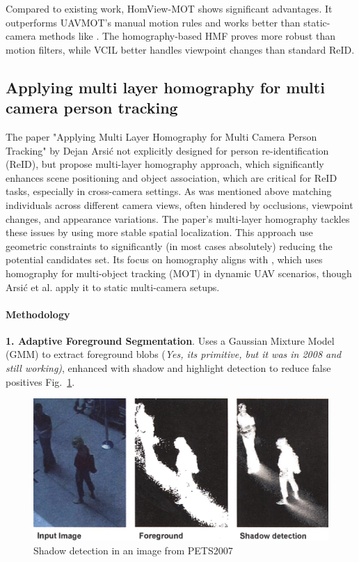 \documentclass[12pt, a4paper]{article}
\begin{document}
Compared to existing work, HomView-MOT shows significant advantages. It outperforms UAVMOT's manual motion rules and works better than static-camera methods like \cite{DeepSORT, SORT, StrongSORT}. The homography-based HMF proves more robust than motion filters, while VCIL better handles viewpoint changes than standard ReID. 


\subsection{Applying multi layer homography for multi camera person tracking  \cite{multi-layer-homography}}
The paper "Applying Multi Layer Homography for Multi Camera Person Tracking" by Dejan Arsić \cite{multi-layer-homography} not explicitly designed for person re-identification (ReID), but propose multi-layer homography approach, which significantly enhances scene positioning and object association, which are critical for ReID tasks, especially in cross-camera settings. As was mentioned above matching individuals across different camera views, often hindered by occlusions, viewpoint changes, and appearance variations. The paper’s multi-layer homography tackles these issues by using more stable spatial localization. This approach use geometric constraints to significantly (in most cases absolutely) reducing the potential candidates set. Its focus on homography aligns with \cite{Homography-UAV}, which uses homography for multi-object tracking (MOT) in dynamic UAV scenarios, though Arsić et al. apply it to static multi-camera setups.

\paragraph{Methodology}
\emph{}
\textbf{1. Adaptive Foreground Segmentation}. Uses a Gaussian Mixture Model (GMM) to extract foreground blobs (\textit{Yes, its primitive, but it was in 2008 and still working)}, enhanced with shadow and highlight detection to reduce false positives Fig.~\ref{fig:shadow_detection}.

\begin{figure}[h]
    \centering
    \includegraphics[width=0.65\linewidth]{pictures/shadow_detection.jpeg}
    \caption{Shadow detection in an image from PETS2007}
    \label{fig:shadow_detection}
\end{figure}
\end{document}
